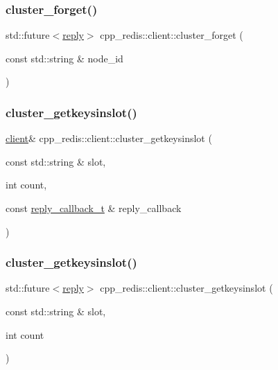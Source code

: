\subsubsection{\texorpdfstring{cluster\+\_\+forget()}{cluster\_forget()}\hspace{0.1cm}{\footnotesize\ttfamily [2/2]}}
{\footnotesize\ttfamily std\+::future$<$\hyperlink{classcpp__redis_1_1reply}{reply}$>$ cpp\+\_\+redis\+::client\+::cluster\+\_\+forget (\begin{DoxyParamCaption}\item[{const std\+::string \&}]{node\+\_\+id }\end{DoxyParamCaption})}

\mbox{\label{classcpp__redis_1_1client_a716e31987800e3ca5483f72972fecfb0}} 
\subsubsection{\texorpdfstring{cluster\+\_\+getkeysinslot()}{cluster\_getkeysinslot()}\hspace{0.1cm}{\footnotesize\ttfamily [1/2]}}
{\footnotesize\ttfamily \hyperlink{classcpp__redis_1_1client}{client}\& cpp\+\_\+redis\+::client\+::cluster\+\_\+getkeysinslot (\begin{DoxyParamCaption}\item[{const std\+::string \&}]{slot,  }\item[{int}]{count,  }\item[{const \hyperlink{classcpp__redis_1_1client_a061a1140d36d2eaeda82b09a0bb3f9f2}{reply\+\_\+callback\+\_\+t} \&}]{reply\+\_\+callback }\end{DoxyParamCaption})}

\mbox{\label{classcpp__redis_1_1client_ad644ef5c24f3eb51de30a827753cc077}} 
\subsubsection{\texorpdfstring{cluster\+\_\+getkeysinslot()}{cluster\_getkeysinslot()}\hspace{0.1cm}{\footnotesize\ttfamily [2/2]}}
{\footnotesize\ttfamily std\+::future$<$\hyperlink{classcpp__redis_1_1reply}{reply}$>$ cpp\+\_\+redis\+::client\+::cluster\+\_\+getkeysinslot (\begin{DoxyParamCaption}\item[{const std\+::string \&}]{slot,  }\item[{int}]{count }\end{DoxyParamCaption})}

